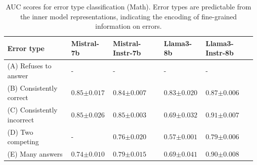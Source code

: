 \begin{table}[t]
    \centering
    \caption{AUC scores for error type classification (Math). Error types are predictable from the inner model representations, indicating the encoding of fine-grained information on errors.}
    \begin{tabular}{l|llll}
    \toprule
       Error type & Mistral-7b & Mistral-Instr-7b & Llama3-8b & Llama3-Instr-8b \\
       \midrule
         (A) Refuses to answer & - & - & - & - \\
         (B) Consistently correct & $0.85 \scriptscriptstyle{\pm 0.017}$ & $0.84 \scriptscriptstyle{\pm 0.007}$ & $0.83 \scriptscriptstyle{\pm 0.020}$ & $0.87 \scriptscriptstyle{\pm 0.006}$ \\
         (C) Consistently incorrect & $0.85 \scriptscriptstyle{\pm 0.026}$ & $0.85 \scriptscriptstyle{\pm 0.003}$ & $0.69 \scriptscriptstyle{\pm 0.032}$ & $0.91 \scriptscriptstyle{\pm 0.007}$ \\
         (D) Two competing & - & $0.76 \scriptscriptstyle{\pm 0.020}$ & $0.57 \scriptscriptstyle{\pm 0.001}$ & $0.79 \scriptscriptstyle{\pm 0.006}$ \\
         (E) Many answers & $0.74 \scriptscriptstyle{\pm 0.010}$ & $0.79 \scriptscriptstyle{\pm 0.015}$ & $0.69 \scriptscriptstyle{\pm0.041}$ & $0.90 \scriptscriptstyle{\pm 0.008}$ \\
    \bottomrule
    \end{tabular}
    \label{tab:error_type_classification_math}
\end{table}